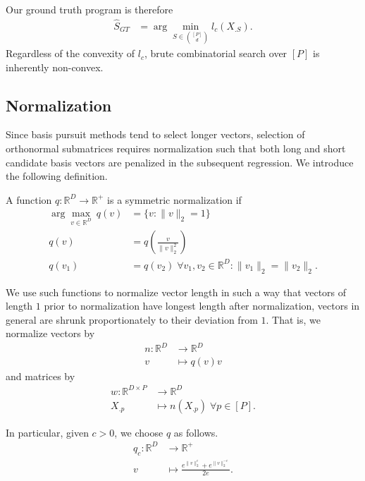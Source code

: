 Our ground truth program is therefore 
\begin{align}
\label{prog:ground_truth}
\widehat { S}_{GT}  &= \arg \min_{ S \in \binom{[P]}{d}} l_c ( X_{. S}).
\end{align}
Regardless of the convexity of $l_c$, brute combinatorial search over $[P]$ is inherently non-convex.

\subsection{Normalization}
\label{sec:normalization}

Since basis pursuit methods tend to select longer vectors, selection of orthonormal submatrices requires normalization such that both long and short candidate basis vectors are penalized in the subsequent regression.
We introduce the following definition.

\begin{definition}
A function $q: \mathbb R^D \to \mathbb R^+ $ is a symmetric normalization if 
\begin{align}
\arg \max_{v \in \mathbb R^D} \ q (v) &=\{ v : \|v\|_2 = 1 \} \\
q(v) &= q(\frac{v}{\|v\|_2^2}) \\
q(v_1) &= q(v_2) \; \forall v_1, v_2 \in \mathbb R^D : \|v_1\|_2 = \|v_2\|_2.
\end{align} \label{def:symmetric_normalization}
\end{definition}

We use such functions to normalize vector length in such a way that vectors of length $1$ prior to normalization have longest length after normalization, vectors in general are shrunk proportionately to their deviation from $1$. 
That is, we normalize vectors by 
\begin{align}
n: \mathbb R^D  &\to \mathbb R^D \\
v &\mapsto {q(v) }v
\end{align}
and matrices by
\begin{align}
w: \mathbb R^{D \times P}  &\to \mathbb R^D \\
 X_{.p} &\mapsto n( X_{.p}) \; \forall p \in [P].
\end{align}

In particular, given $c > 0$, we choose $q$ as follows.
\begin{align}
\label{eq:normalization}
q_c: \mathbb R^D  &\to \mathbb R^+ \\
v  &\mapsto \frac{e^{\|v\|_2^c} + e^{\|v\|_2^{-c}}}{2e}.
\end{align}

